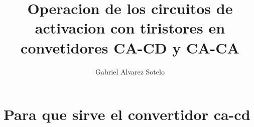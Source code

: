 \documentclass[10pt,a4paper]{article}
\author{Gabriel Alvarez Sotelo}
\title{Operacion de los circuitos de activacion con tiristores en convetidores CA-CD y CA-CA}
\begin{document}
\maketitle\section{Para que sirve el convertidor ca-cd}

 
\end{document}
